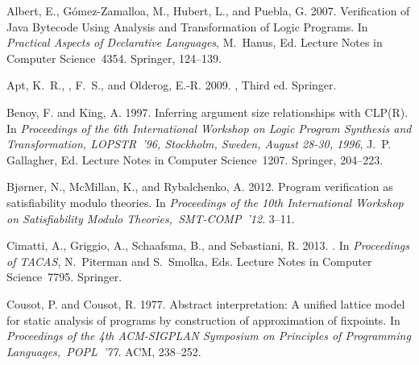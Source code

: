 \documentclass[english]{tlp}
\begin{document}
\begin{thebibliography}{}

{\sc Albert, E.}, {\sc G\'{o}mez-Zamalloa, M.}, {\sc Hubert, L.}, {\sc and}
  {\sc Puebla, G.} 2007.
\newblock Verification of {J}ava {B}ytecode {U}sing {A}nalysis and
  {T}ransformation of {L}ogic {P}rograms.
\newblock In {\em Practical {A}spects of {D}eclarative {L}anguages},
  {M.~Hanus}, Ed. Lecture Notes in Computer Science~4354. Springer, 124--139.

{\sc Apt, K.~R.}, {, F.~S.}, {\sc and} {\sc Olderog, E.-R.} 2009.
, {T}hird
  ed.
\newblock Springer.

{\sc Benoy, F.} {\sc and} {\sc King, A.} 1997.
\newblock Inferring argument size relationships with {CLP(R)}.
\newblock In {\em Proceedings of the 6th International Workshop on Logic
  Program Synthesis and Transformation, LOPSTR~'96, Stockholm, Sweden, August
  28-30, 1996}, {J.~P. Gallagher}, Ed. Lecture Notes in Computer Science~1207.
  Springer, 204--223.

{\sc Bj{\o}rner, N.}, {\sc McMillan, K.}, {\sc and} {\sc Rybalchenko, A.} 2012.
\newblock Program verification as satisfiability modulo theories.
\newblock In {\em Proceedings of the 10th International Workshop on
  Satisfiability Modulo Theories,~SMT-COMP~'12}. 3--11.

{\sc Cimatti, A.}, {\sc Griggio, A.}, {\sc Schaafsma, B.}, {\sc and} {\sc
  Sebastiani, R.} 2013.
.
\newblock In {\em Proceedings of TACAS}, {N.~Piterman} {and} {S.~Smolka}, Eds.
  Lecture Notes in Computer Science~7795. Springer.

{\sc Cousot, P.} {\sc and} {\sc Cousot, R.} 1977.
\newblock Abstract interpretation: {A} unified lattice model for static
  analysis of pro\-grams by construction of approximation of fixpoints.
\newblock In {\em Proceedings of the 4th {ACM-SIGPLAN} Symposium on Principles
  of Pro\-gramming Languages,~POPL~'77}. {ACM}, 238--252.


\end{thebibliography}
\end{document}
